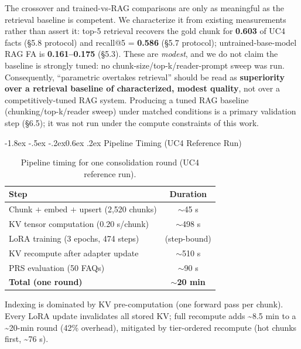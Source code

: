 \documentclass[10pt,twocolumn]{article}
\makeatletter
\renewcommand\subsection{\@startsection{subsection}{2}{\z@}%
  {-1.8ex \@plus -.5ex \@minus -.2ex}{0.6ex \@plus .2ex}%
  {\normalfont\normalsize\bfseries}}
\makeatother
\begin{document}
The crossover and trained-vs-RAG comparisons are only as meaningful as the retrieval baseline is competent. We characterize it from existing measurements rather than assert it: top-5 retrieval recovers the gold chunk for \textbf{0.603} of UC4 facts (§5.8 protocol) and recall@5 = \textbf{0.586} (§5.7 protocol); untrained-base-model RAG FA is \textbf{0.161--0.175} (§5.3). These are \emph{modest}, and we do not claim the baseline is strongly tuned: no chunk-size/top-k/reader-prompt sweep was run. Consequently, ``parametric overtakes retrieval'' should be read as \textbf{superiority over a retrieval baseline of characterized, modest quality}, not over a competitively-tuned RAG system. Producing a tuned RAG baseline (chunking/top-k/reader sweep) under matched conditions is a primary validation step (§6.5); it was not run under the compute constraints of this work.

\hypertarget{pipeline-timing-uc4-reference-run}{%
\subsection{Pipeline Timing (UC4 Reference Run)}\label{pipeline-timing-uc4-reference-run}}

\begin{table}[!htbp]
\centering
\caption{Pipeline timing for one consolidation round (UC4 reference run).}
\label{tab:timing}
\small
\begin{tabularx}{\columnwidth}{@{}L c@{}}
\toprule
Step & Duration \\
\midrule
Chunk $+$ embed $+$ upsert (2,520 chunks) & $\sim$45 s \\
KV tensor computation (0.20 s/chunk) & $\sim$498 s \\
LoRA training (3 epochs, 474 steps) & (step-bound) \\
KV recompute after adapter update & $\sim$510 s \\
PRS evaluation (50 FAQs) & $\sim$90 s \\
\textbf{Total (one round)} & \textbf{$\sim$20 min} \\
\bottomrule
\end{tabularx}
\end{table}

Indexing is dominated by KV pre-computation (one forward pass per chunk). Every LoRA update invalidates all stored KV; full recompute adds \textasciitilde8.5 min to a \textasciitilde20-min round (42\% overhead), mitigated by tier-ordered recompute (hot chunks first, \textasciitilde76 s).
\end{document}
